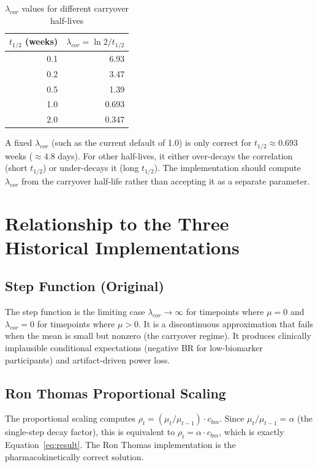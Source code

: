 \documentclass[11pt]{article}
\begin{document}
\begin{table}[h]
\centering
\caption{$\lambda_{cor}$ values for different carryover
  half-lives}
\begin{tabular}{rr}
\toprule
$t_{1/2}$ (weeks) & $\lambda_{cor} = \ln 2 / t_{1/2}$ \\
\midrule
0.1 & 6.93 \\
0.2 & 3.47 \\
0.5 & 1.39 \\
1.0 & 0.693 \\
2.0 & 0.347 \\
\bottomrule
\end{tabular}
\end{table}

A fixed $\lambda_{cor}$ (such as the current default of 1.0)
is only correct for $t_{1/2} \approx 0.693$ weeks
($\approx 4.8$ days). For other half-lives, it either
over-decays the correlation (short $t_{1/2}$) or
under-decays it (long $t_{1/2}$). The implementation
should compute $\lambda_{cor}$ from the carryover half-life
rather than accepting it as a separate parameter.

\section{Relationship to the Three Historical Implementations}

\subsection{Step Function (Original)}

The step function is the limiting case
$\lambda_{cor} \to \infty$ for timepoints where $\mu = 0$
and $\lambda_{cor} = 0$ for timepoints where $\mu > 0$.
It is a discontinuous approximation that fails when the
mean is small but nonzero (the carryover regime). It
produces clinically implausible conditional expectations
(negative BR for low-biomarker participants) and
artifact-driven power loss.

\subsection{Ron Thomas Proportional Scaling}

The proportional scaling computes $\rho_t = (\mu_t /
\mu_{t-1}) \cdot c_{bm}$. Since $\mu_t / \mu_{t-1} =
\alpha$ (the single-step decay factor), this is equivalent
to $\rho_t = \alpha \cdot c_{bm}$, which is exactly
Equation~\ref{eq:result}. The Ron Thomas implementation
is the pharmacokinetically correct solution.
\end{document}
